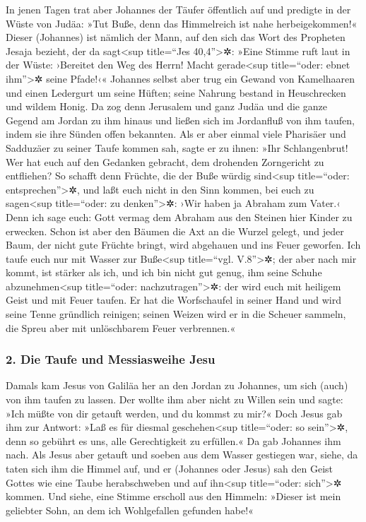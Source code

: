  In jenen Tagen trat aber Johannes der Täufer öffentlich
auf und predigte in der Wüste von Judäa:  »Tut Buße, denn
das Himmelreich ist nahe herbeigekommen!«  Dieser
(Johannes) ist nämlich der Mann, auf den sich das Wort des Propheten
Jesaja bezieht, der da sagt\textless sup title=``Jes
40,4''\textgreater✲: »Eine Stimme ruft laut in der Wüste: ›Bereitet den
Weg des Herrn! Macht gerade\textless sup title=``oder: ebnet
ihm''\textgreater✲ seine Pfade!‹«  Johannes selbst aber
trug ein Gewand von Kamelhaaren und einen Ledergurt um seine Hüften;
seine Nahrung bestand in Heuschrecken und wildem Honig. 
Da zog denn Jerusalem und ganz Judäa und die ganze Gegend am Jordan zu
ihm hinaus  und ließen sich im Jordanfluß von ihm taufen,
indem sie ihre Sünden offen bekannten.  Als er aber einmal
viele Pharisäer und Sadduzäer zu seiner Taufe kommen sah, sagte er zu
ihnen: »Ihr Schlangenbrut! Wer hat euch auf den Gedanken gebracht, dem
drohenden Zorngericht zu entfliehen?  So schafft denn
Früchte, die der Buße würdig sind\textless sup title=``oder:
entsprechen''\textgreater✲,  und laßt euch nicht in den
Sinn kommen, bei euch zu sagen\textless sup title=``oder: zu
denken''\textgreater✲: ›Wir haben ja Abraham zum Vater.‹ Denn ich sage
euch: Gott vermag dem Abraham aus den Steinen hier Kinder zu erwecken.
 Schon ist aber den Bäumen die Axt an die Wurzel gelegt,
und jeder Baum, der nicht gute Früchte bringt, wird abgehauen und ins
Feuer geworfen.  Ich taufe euch nur mit Wasser zur
Buße\textless sup title=``vgl. V.8''\textgreater✲; der aber nach mir
kommt, ist stärker als ich, und ich bin nicht gut genug, ihm seine
Schuhe abzunehmen\textless sup title=``oder:
nachzutragen''\textgreater✲: der wird euch mit heiligem Geist und mit
Feuer taufen.  Er hat die Worfschaufel in seiner Hand und
wird seine Tenne gründlich reinigen; seinen Weizen wird er in die
Scheuer sammeln, die Spreu aber mit unlöschbarem Feuer verbrennen.«

\hypertarget{die-taufe-und-messiasweihe-jesu}{%
\subsubsection{2. Die Taufe und Messiasweihe
Jesu}\label{die-taufe-und-messiasweihe-jesu}}

 Damals kam Jesus von Galiläa her an den Jordan zu
Johannes, um sich (auch) von ihm taufen zu lassen.  Der
wollte ihm aber nicht zu Willen sein und sagte: »Ich müßte von dir
getauft werden, und du kommst zu mir?«  Doch Jesus gab
ihm zur Antwort: »Laß es für diesmal geschehen\textless sup
title=``oder: so sein''\textgreater✲, denn so gebührt es uns, alle
Gerechtigkeit zu erfüllen.« Da gab Johannes ihm nach. 
Als Jesus aber getauft und soeben aus dem Wasser gestiegen war, siehe,
da taten sich ihm die Himmel auf, und er (Johannes oder Jesus) sah den
Geist Gottes wie eine Taube herabschweben und auf ihn\textless sup
title=``oder: sich''\textgreater✲ kommen.  Und siehe,
eine Stimme erscholl aus den Himmeln: »Dieser ist mein geliebter Sohn,
an dem ich Wohlgefallen gefunden habe!«

